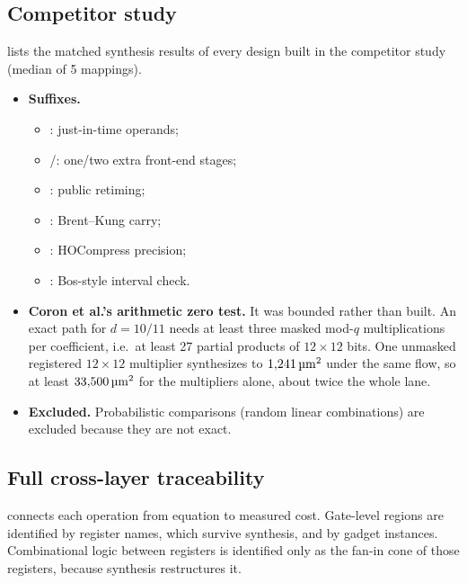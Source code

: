 \subsection{Competitor study}\label{app:competitors}
 lists the matched synthesis results of every design built in the competitor study (median of 5 mappings).
\begin{itemize}
  \item \textbf{Suffixes.}
  \begin{itemize}
    \item {}: just-in-time operands;
    \item {}/: one/two extra front-end stages;
    \item {}: \PAMS{} public retiming;
    \item {}: Brent--Kung carry;
    \item {}: HOCompress precision;
    \item {}: Bos-style interval check.
  \end{itemize}
  \item \textbf{Coron et al.'s arithmetic zero test.} It was bounded rather than built. An exact path for $d = 10/11$ needs at least three masked mod-$q$ multiplications per coefficient, i.e.\ at least 27 partial products of $12 \times 12$ bits. One unmasked registered $12 \times 12$ multiplier synthesizes to $1{,}241\,\si{\micro\meter\squared}$ under the same flow, so at least $33{,}500\,\si{\micro\meter\squared}$ for the multipliers alone, about twice the whole \PAMS{} lane.
  \item \textbf{Excluded.} Probabilistic comparisons (random linear combinations) are excluded because they are not exact.
\end{itemize}

\begin{table}[h]\centering\small
\caption{Competitor study, synthesis (Nangate45, flow B, median of 5 mappings), generated from .}\label{tab:competitors}

\end{table}

\subsection{Full cross-layer traceability}\label{app:traceability}
 connects each operation from equation to measured cost. Gate-level regions are identified by register names, which survive synthesis, and by gadget instances. Combinational logic between registers is identified only as the fan-in cone of those registers, because synthesis restructures it.

